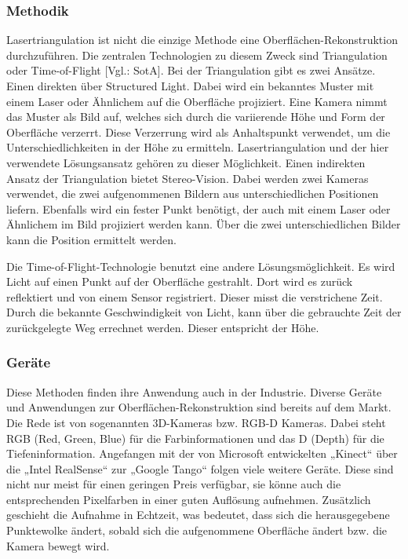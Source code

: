 		\subsubsection{Methodik}
		Lasertriangulation ist nicht die einzige Methode eine Oberflächen-Rekonstruktion  \linebreak durchzuführen. Die zentralen Technologien zu diesem Zweck sind Triangulation oder Time-of-Flight [Vgl.: SotA]. 
		Bei der Triangulation gibt es zwei Ansätze. Einen direkten über Structured Light. Dabei wird ein bekanntes Muster mit einem Laser oder Ähnlichem auf die Oberfläche projiziert. Eine Kamera nimmt das Muster als Bild auf, welches sich durch die variierende Höhe und Form der Oberfläche verzerrt. Diese Verzerrung wird als Anhaltspunkt verwendet, um die Unterschiedlichkeiten in der Höhe zu ermitteln. Lasertriangulation und der hier verwendete Lösungsansatz gehören zu dieser Möglichkeit. 
		Einen indirekten Ansatz der Triangulation bietet Stereo-Vision. Dabei werden zwei Kameras verwendet, die zwei aufgenommenen Bildern aus unterschiedlichen Positionen liefern. Ebenfalls wird ein fester Punkt benötigt, der auch mit einem Laser oder Ähnlichem im Bild projiziert werden kann. Über die zwei unterschiedlichen Bilder kann die Position ermittelt werden.
		
		Die Time-of-Flight-Technologie benutzt eine andere Lösungsmöglichkeit. Es wird Licht auf einen Punkt auf der Oberfläche gestrahlt. Dort wird es zurück reflektiert und von einem Sensor registriert. Dieser misst die verstrichene Zeit. Durch die bekannte  \linebreak Geschwindigkeit von Licht, kann über die gebrauchte Zeit der zurückgelegte Weg errechnet werden. Dieser entspricht der Höhe.
	
		\subsubsection{Geräte}
		Diese Methoden finden ihre Anwendung auch in der Industrie. Diverse Geräte und Anwendungen zur Oberflächen-Rekonstruktion sind bereits auf dem Markt. Die Rede ist von sogenannten 3D-Kameras bzw. RGB-D Kameras. Dabei steht RGB (Red, Green, Blue) für die Farbinformationen und das D (Depth) für die Tiefeninformation. Angefangen mit der von Microsoft entwickelten „Kinect“ über die „Intel RealSense“ zur „Google Tango“ folgen viele weitere Geräte. Diese sind nicht nur meist für einen geringen Preis verfügbar, sie könne auch die entsprechenden Pixelfarben in einer guten Auflösung  \linebreak aufnehmen.
		Zusätzlich geschieht die Aufnahme in Echtzeit, was bedeutet, dass sich die herausgegebene Punktewolke ändert, sobald sich die aufgenommene Oberfläche ändert bzw. die Kamera bewegt wird.
			
